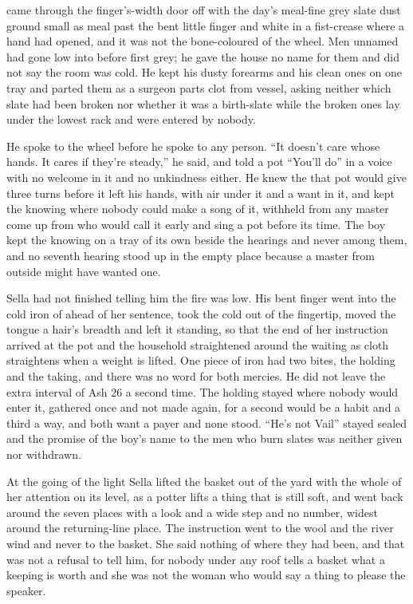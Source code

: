  came through the finger's-width door off  with the day's meal-fine grey slate dust ground small as meal past the bent little finger and white in a fist-crease where a hand had opened, and it was not the bone-coloured  of the wheel. Men unnamed had gone low into  before first grey; he gave the house no name for them and did not say the room was cold. He kept his dusty forearms and his clean ones on one tray and parted them as a surgeon parts clot from vessel, asking neither which slate had been broken nor whether it was a birth-slate while the broken ones lay under the lowest rack and were entered by nobody.

He spoke to the wheel before he spoke to any person. “It doesn't care whose hands. It cares if they're steady,” he said, and told a pot “You'll do” in a voice with no welcome in it and no unkindness either. He knew the  that pot would give three turns before it left his hands, with air under it and a want in it, and kept the knowing where nobody could make a song of it, withheld from any master come up from  who would call it early and sing a pot before its time. The boy kept the knowing on a tray of its own beside the hearings and never among them, and no seventh hearing stood up in the empty place because a master from outside might have wanted one.

Sella had not finished telling him the fire was low. His bent finger went into the cold iron of  ahead of her sentence, took the cold out of the fingertip, moved the tongue a hair's breadth and left it standing, so that the end of her instruction arrived at the pot and the household straightened around the waiting as cloth straightens when a weight is lifted. One piece of iron had two bites, the holding and the taking, and there was no  word for both mercies. He did not leave the extra interval of Ash 26 a second time. The holding stayed where nobody would enter it, gathered once and not made again, for a second would be a habit and a third a way, and both want a payer and none stood. “He's not Vail” stayed sealed and the promise of the boy's name to the men who burn slates was neither given nor withdrawn.

\scenebreak

At the going of the light Sella lifted the basket out of the yard with the whole of her attention on its level, as a potter lifts a thing that is still soft, and went back around the seven places with a look and a wide step and no number, widest around the returning-line place. The instruction went to the wool and the river wind and never to the basket. She said nothing of where they had been, and that was not a refusal to tell him, for nobody under any roof tells a basket what a keeping is worth and she was not the woman who would say a thing to please the speaker.


